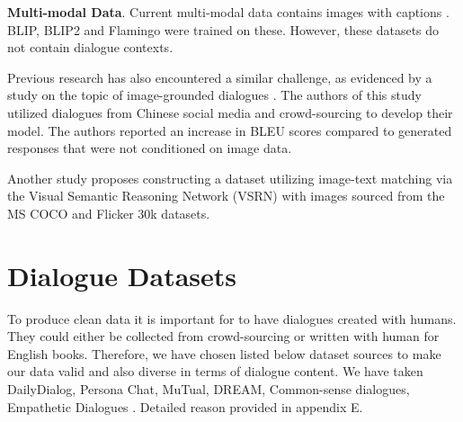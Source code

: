 \documentclass[11pt]{article}
\begin{document}
\textbf{Multi-modal Data}. Current multi-modal data contains images with captions \cite{laion,SBU-captions,visual-genome,conceptual,ms-coco,ALIGN}. BLIP, BLIP2 and Flamingo were trained on these. However, these datasets do not contain dialogue contexts.

Previous research has also encountered a similar challenge, as evidenced by a study on the topic of image-grounded dialogues \cite{mm_chat}. The authors of this study utilized dialogues from Chinese social media and crowd-sourcing to develop their model. The authors reported an increase in BLEU \cite{bleu} scores compared to generated responses that were not conditioned on image data.

Another study \cite{Lee-2021} proposes constructing a dataset utilizing image-text matching via the Visual Semantic Reasoning Network (VSRN) \cite{li2019vsrn} with images sourced from the MS COCO \cite{ms-coco} and Flicker 30k \cite{flicker30k} datasets. %










\section{Dialogue Datasets}

To produce clean data it is important for to have dialogues created with humans. They could either be collected from crowd-sourcing or written with human for English books. Therefore, we have chosen listed below dataset sources to make our data valid and also diverse in terms of dialogue content. We have taken DailyDialog, Persona Chat, MuTual, DREAM, Common-sense dialogues, Empathetic Dialogues \cite{Zhang-2018,Li-Su-2017,cui-etal-2020-mutual,Zhou-2021,Rashkin-2018,Sun-2019}. Detailed reason provided in appendix E.
\end{document}
